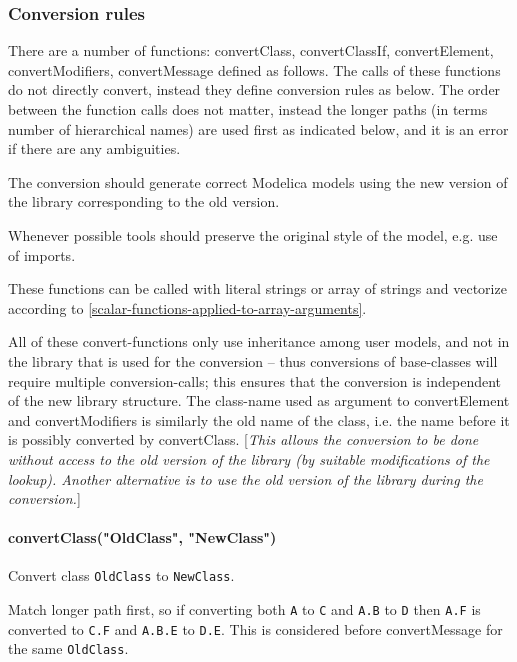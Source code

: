 \subsubsection{Conversion rules}

There are a number of functions: convertClass, convertClassIf,
convertElement, convertModifiers, convertMessage defined as follows. The
calls of these functions do not directly convert, instead they define
conversion rules as below. The order between the function calls does not
matter, instead the longer paths (in terms number of hierarchical names)
are used first as indicated below, and it is an error if there are any
ambiguities.

The conversion should generate correct Modelica models using the new version of the library
corresponding to the old version.

\begin{nonnormative}
Whenever possible tools should preserve the original style of the model, e.g. use of imports.
\end{nonnormative}

These functions can be called with literal strings or array of strings
and vectorize according to \autoref{scalar-functions-applied-to-array-arguments}.

All of these convert-functions only use inheritance among user
models, and not in the library that is used for the conversion -- thus
conversions of base-classes will require multiple conversion-calls; this
ensures that the conversion is independent of the new library structure.
The class-name used as argument to convertElement and convertModifiers
is similarly the old name of the class, i.e. the name before it is
possibly converted by convertClass. {[}\emph{This allows the conversion
to be done without access to the old version of the library (by suitable
modifications of the lookup). Another alternative is to use the old
version of the library during the conversion.}{]}

\paragraph*{convertClass("OldClass", "NewClass")}

Convert class \lstinline!OldClass! to \lstinline!NewClass!.

Match longer path first, so if converting both \lstinline!A! to \lstinline!C! and \lstinline!A.B! to \lstinline!D! then
\lstinline!A.F! is converted to \lstinline!C.F! and \lstinline!A.B.E! to \lstinline!D.E!. This is considered before
convertMessage for the same \lstinline!OldClass!.

